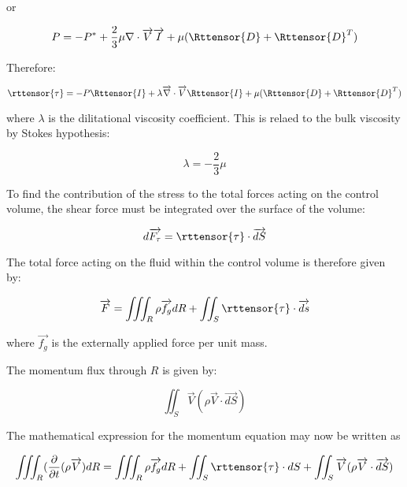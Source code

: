 or

\begin{equation}
  P = -P^* + \frac{2}{3}\mu \nabla\cdot\overrightarrow{V}\overrightarrow{I} + \mu ( \Rttensor{D} + \Rttensor{D}^T )
\end{equation}

Therefore:

\begin{equation}
\rttensor{\tau} = -P\Rttensor{I} + \lambda\overrightarrow{\nabla}\cdot\overrightarrow{V}\Rttensor{I}  + \mu ( \Rttensor{D} + \Rttensor{D}^T )
\end{equation}

where $\lambda$ is the dilitational viscosity coefficient. This is relaed to
the bulk viscosity by Stokes hypothesis:

\begin{equation}
  \lambda =  - \frac{2}{3}\mu
\end{equation}

To find the contribution of the stress to the total forces acting on the
control volume, the shear force must be integrated over the surface of the
volume:

\begin{equation}
  d\overrightarrow{F_\tau} = \rttensor{\tau}\cdot \overrightarrow{dS}
\end{equation}

The total force acting on the fluid within the control volume is therefore given by:

\begin{equation}
  \overrightarrow{F} = \iiint_R\rho\overrightarrow{f_g} dR + \iint_S\rttensor{\tau}\cdot \overrightarrow{ds}
\end{equation}

where $\overrightarrow{f_g}$ is the externally applied force per unit mass.

The momentum flux through $R$ is given by:

\begin{equation}
  \iint_S \overrightarrow{V}\left(\rho\overrightarrow{V}\cdot\overrightarrow{dS}\right)
\end{equation}

The mathematical expression for the momentum equation may now be written as

\begin{equation}
  \iiint_R(\frac{\partial}{\partial{t}}(\rho\overrightarrow{V})dR = \iiint_R\rho\overrightarrow{f_g} dR + 
    \iint_S\rttensor{\tau}\cdot dS + \iint_S \overrightarrow{V}(\rho\overrightarrow{V}\cdot \overrightarrow{dS})
\end{equation}

